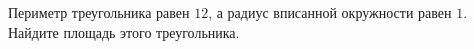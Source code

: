 \begin{ex}
	\begin{condition}
		Периметр треугольника равен \(12\), а радиус вписанной окружности равен \( 1 \). Найдите площадь этого треугольника.
	\end{condition}
\end{ex}